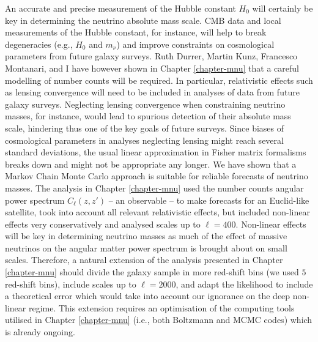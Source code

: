An accurate and precise measurement of the Hubble constant $H_0$ will certainly be key in determining the neutrino absolute mass scale. CMB data and local measurements of the Hubble constant, for instance, will help to break degeneracies (e.g., $H_0$ and $m_\nu$) and improve constraints on cosmological parameters from future galaxy surveys.  Ruth Durrer, Martin Kunz, Francesco Montanari, and I have however shown in Chapter \ref{chapter-mnu} that a careful modelling of number counts will be required. In particular, relativistic effects such as lensing convergence will need to be included in analyses of data from future galaxy surveys. Neglecting lensing convergence when constraining neutrino masses, for instance, would lead to spurious detection of their absolute mass scale, hindering thus one of the key goals of future surveys. Since biases of cosmological parameters in analyses neglecting lensing might reach several standard deviations, the usual linear approximation in Fisher matrix formalisms breaks down and might not be appropriate any longer. We have shown that a Markov Chain Monte Carlo approach is suitable for reliable forecasts of neutrino masses. The analysis in Chapter \ref{chapter-mnu} used the number counts angular power spectrum $C_\ell(z,z')$ -- an observable -- to make forecasts for an Euclid-like satellite, took into account all relevant relativistic effects, but included non-linear effects very conservatively and analysed scales up to $\ell=400$. Non-linear effects will be key in determining neutrino masses as much of the effect of massive neutrinos on the angular matter power spectrum is brought about on small scales. Therefore, a natural extension of the analysis presented in Chapter \ref{chapter-mnu} should divide the galaxy sample in more red-shift bins (we used $5$ red-shift bins), include scales up to $\ell=2000$, and adapt the likelihood to include a theoretical error which would take into account our ignorance on the deep non-linear regime. This extension requires an optimisation of the computing tools utilised in Chapter \ref{chapter-mnu} (i.e., both Boltzmann and MCMC codes) which is already ongoing.   

